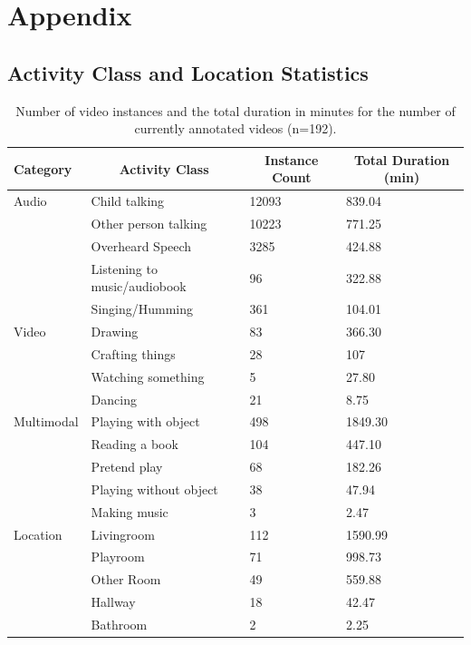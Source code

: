 \documentclass[
  man,floatsintext]{apa6}
\begin{document}
\endgroup

\newpage

\section{Appendix}\label{appendix}

\subsection{Activity Class and Location Statistics}\label{activity-class-and-location-statistics}

\begin{table}[H]

\begin{center}
\begin{threeparttable}

\caption{\label{tab:activity-classes-statistics}Number of video instances and the total duration in minutes for the number of currently annotated videos (n=192).}

\begin{tabular}{llll}
\toprule
Category & \multicolumn{1}{c}{Activity Class} & \multicolumn{1}{c}{Instance Count} & \multicolumn{1}{c}{Total Duration (min)}\\
\midrule
Audio & Child talking & 12093 & 839.04\\
 & Other person talking & 10223 & 771.25\\
 & Overheard Speech & 3285 & 424.88\\
 & Listening to music/audiobook & 96 & 322.88\\
 & Singing/Humming & 361 & 104.01\\
Video & Drawing & 83 & 366.30\\
 & Crafting things & 28 & 107\\
 & Watching something & 5 & 27.80\\
 & Dancing & 21 & 8.75\\
Multimodal & Playing with object & 498 & 1849.30\\
 & Reading a book & 104 & 447.10\\
 & Pretend play & 68 & 182.26\\
 & Playing without object & 38 & 47.94\\
 & Making music & 3 & 2.47\\
Location & Livingroom & 112 & 1590.99\\
 & Playroom & 71 & 998.73\\
 & Other Room & 49 & 559.88\\
 & Hallway & 18 & 42.47\\
 & Bathroom & 2 & 2.25\\
\bottomrule
\end{tabular}

\end{threeparttable}
\end{center}

\end{table}
\newpage
\end{document}
